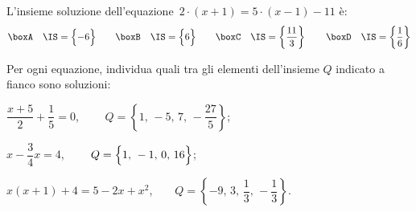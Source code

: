 \begin{esercizio}
\label{ese:15.49}
L'insieme soluzione dell'equazione~$2\cdot \left(x+1\right)=5\cdot \left(x-1\right)-11$ è:
\[\boxA\quad \IS=\Bigl\{-6\Bigr\}\qquad\boxB\quad \IS=\Bigl\{6\Bigr\}\qquad\boxC\quad \IS=\left\{\dfrac{11}{3}\right\}\qquad\boxD\quad \IS=\left\{\dfrac{1}{6}\right\}\]
\end{esercizio}

\begin{esercizio}
\label{ese:15.50}
Per ogni equazione, individua quali tra gli elementi dell'insieme $Q$ indicato a fianco sono soluzioni:
\begin{enumeratea}
\spazielenx
 \item $\dfrac{x+5}{2}+\dfrac{1}{5}=0$, $\qquad Q=\left\{1\text{,~}-5\text{,~}7\text{,~}-\dfrac{27}{5}\right\}$;
 \item $x-\dfrac{3}{4}x=4$, $\qquad Q=\Bigl\{1\text{,~}-1\text{,~}0\text{,~}16\Bigr\}$;
 \item $x(x+1)+4=5-2x+x^{2}$,$\qquad Q=\left\{-9\text{,~}3\text{,~}\dfrac{1}{3}\text{,~}-\dfrac{1}{3}\right\}$.
\end{enumeratea}
\end{esercizio}

